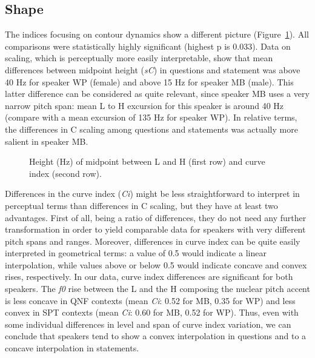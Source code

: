 \subsection{Shape}\label{sec233}
The indices focusing on contour dynamics show a different picture (Figure~\ref{fig208}). All comparisons were statistically highly significant (highest p is 0.033). Data on scaling, which is perceptually more easily interpretable, show that mean differences between midpoint height (\textit{sC}) in questions and statement was above 40 Hz for speaker WP (female) and above 15 Hz for speaker MB (male). This latter difference can be considered as quite relevant, since speaker MB uses a very narrow pitch span: mean L to H excursion for this speaker is around 40 Hz (compare with a mean excursion of 135 Hz for speaker WP). In relative terms, the differences in C scaling among questions and statements was actually more salient in speaker MB.

\begin{figure}
\centering
{}
\caption{Height (Hz) of midpoint between L and H (first row) and curve index (second row).}
\label{fig208}\end{figure}

Differences in the curve index (\textit{Ci}) might be less straightforward to interpret in perceptual terms than differences in C scaling, but they have at least two advantages. First of all, being a ratio of differences, they do not need any further transformation in order to yield comparable data for speakers with very different pitch spans and ranges. Moreover, differences in curve index can be quite easily interpreted in geometrical terms: a value of 0.5 would indicate a linear interpolation, while values above or below 0.5 would indicate concave and convex rises, respectively. 
In our data, curve index differences are significant for both speakers. The \textit{f0} rise between the L and the H composing the nuclear pitch accent is less concave in QNF contexts (mean \textit{Ci}: 0.52 for MB, 0.35 for WP) and less convex in SPT contexts (mean \textit{Ci}: 0.60 for MB, 0.52 for WP). Thus, even with some individual differences in level and span of curve index variation, we can conclude that speakers tend to show a convex interpolation in questions and to a concave interpolation in statements.

